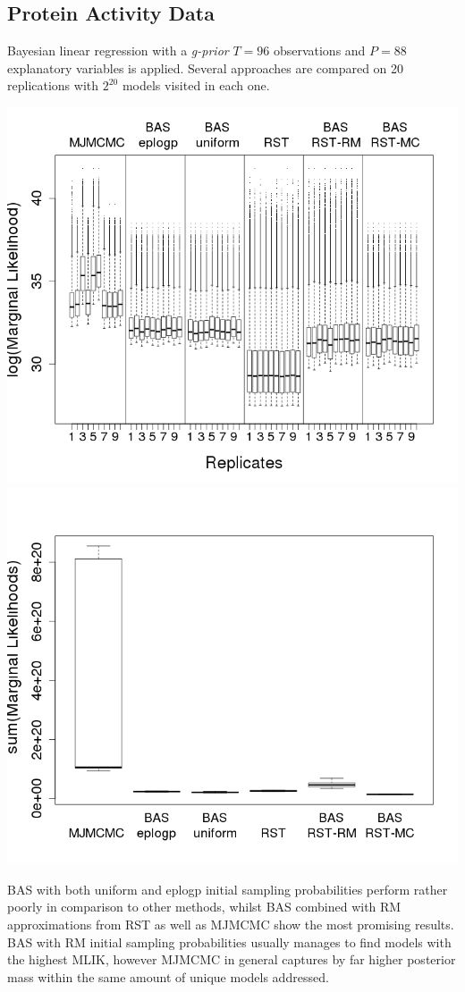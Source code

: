\documentclass[a0,portrait]{a0poster}
\begin{document}
\begin{multicols}{2}
\subsection*{Protein Activity Data}
\color{DarkSlateGray} %
Bayesian linear regression with a \textit{g-prior} $T = 96$ observations and $P = 88$ explanatory variables is applied. Several approaches are compared on 20 replications with $2^{20}$ models visited in each one. 
\begin{center}\vspace{0cm}
\includegraphics[width=0.48\linewidth]{figures/mliks.jpeg}
\includegraphics[width=0.48\linewidth]{figures/massesbig.jpeg}\label{figmlikmass}
\end{center}\vspace{0.2cm}


BAS with both uniform and eplogp initial sampling probabilities perform rather poorly in comparison to other methods, whilst BAS combined with RM approximations from RST as well as MJMCMC show the most promising results. BAS with RM initial sampling probabilities usually manages to find models with the highest MLIK, however MJMCMC in general captures by far higher posterior mass within the same amount of unique models addressed.


\end{multicols}
\end{document}
